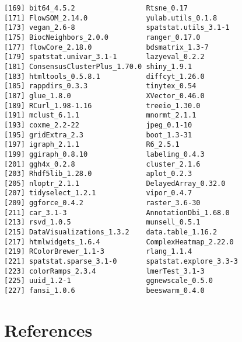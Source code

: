 \documentclass[
  letterpaper,
  DIV=11,
  numbers=noendperiod]{scrreprt}
\newlength{\cslhangindent}
\newenvironment{CSLReferences}[2] %
 {\begin{list}{}{%
  \setlength{\itemindent}{0pt}
  \setlength{\leftmargin}{0pt}
  \setlength{\parsep}{0pt}
  \ifodd #1
   \setlength{\leftmargin}{\cslhangindent}
   \setlength{\itemindent}{-1\cslhangindent}
  \fi
  \setlength{\itemsep}{#2\baselineskip}}}
 {\end{list}}
\begin{document}
\begin{verbatim}
[169] bit64_4.5.2                 Rtsne_0.17                 
[171] FlowSOM_2.14.0              yulab.utils_0.1.8          
[173] vegan_2.6-8                 spatstat.utils_3.1-1       
[175] BiocNeighbors_2.0.0         ranger_0.17.0              
[177] flowCore_2.18.0             bdsmatrix_1.3-7            
[179] spatstat.univar_3.1-1       lazyeval_0.2.2             
[181] ConsensusClusterPlus_1.70.0 shiny_1.9.1                
[183] htmltools_0.5.8.1           diffcyt_1.26.0             
[185] rappdirs_0.3.3              tinytex_0.54               
[187] glue_1.8.0                  XVector_0.46.0             
[189] RCurl_1.98-1.16             treeio_1.30.0              
[191] mclust_6.1.1                mnormt_2.1.1               
[193] coxme_2.2-22                jpeg_0.1-10                
[195] gridExtra_2.3               boot_1.3-31                
[197] igraph_2.1.1                R6_2.5.1                   
[199] ggiraph_0.8.10              labeling_0.4.3             
[201] ggh4x_0.2.8                 cluster_2.1.6              
[203] Rhdf5lib_1.28.0             aplot_0.2.3                
[205] nloptr_2.1.1                DelayedArray_0.32.0        
[207] tidyselect_1.2.1            vipor_0.4.7                
[209] ggforce_0.4.2               raster_3.6-30              
[211] car_3.1-3                   AnnotationDbi_1.68.0       
[213] rsvd_1.0.5                  munsell_0.5.1              
[215] DataVisualizations_1.3.2    data.table_1.16.2          
[217] htmlwidgets_1.6.4           ComplexHeatmap_2.22.0      
[219] RColorBrewer_1.1-3          rlang_1.1.4                
[221] spatstat.sparse_3.1-0       spatstat.explore_3.3-3     
[223] colorRamps_2.3.4            lmerTest_3.1-3             
[225] uuid_1.2-1                  ggnewscale_0.5.0           
[227] fansi_1.0.6                 beeswarm_0.4.0             
\end{verbatim}


\chapter*{References}\label{references}


\label{refs}
\begin{CSLReferences}{0}{1}
\end{CSLReferences}
\end{document}
